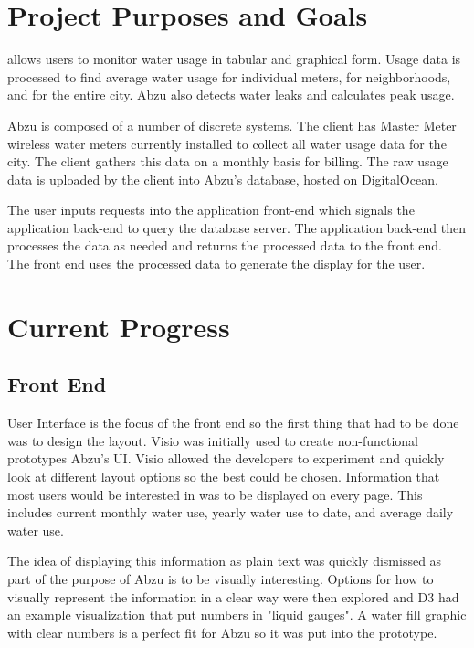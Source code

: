 \documentclass[journal]{IEEEtran}
\begin{document}
\section{Project Purposes and Goals}
 allows users to monitor water usage in tabular and graphical form. Usage data is processed to find average water usage for individual meters, for neighborhoods, and for the entire city. Abzu also detects water leaks and calculates peak usage. 

Abzu is composed of a number of discrete systems. The client has Master Meter wireless water meters currently installed to collect all water usage data for the city. The client gathers this data on a monthly basis for billing. The raw usage data is uploaded by the client into Abzu's database, hosted on DigitalOcean.

The user inputs requests into the application front-end which signals the application back-end to query the database server. The application back-end then processes the data as needed and returns the processed data to the front end. The front end uses the processed data to generate the display for the user. 



\section{Current Progress}
\subsection{Front End}
 User Interface is the focus of the front end so the first thing that had to be done was to design the layout. Visio was initially used to create non-functional prototypes Abzu's UI. Visio allowed the developers to experiment and quickly look at different layout options so the best could be chosen. Information that most users would be interested in was to be displayed on every page. This includes current monthly water use, yearly water use to date, and average daily water use.

The idea of displaying this information as plain text was quickly dismissed as part of the purpose of Abzu is to be visually interesting. Options for how to visually represent the information in a clear way were then explored and D3 had an example visualization that put numbers in "liquid gauges". A water fill graphic with clear numbers is a perfect fit for Abzu so it was put into the prototype.
\end{document}
